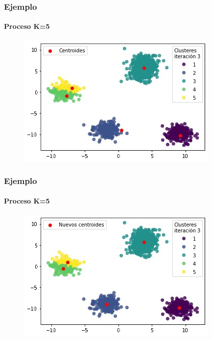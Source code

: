 \documentclass[
  shownotes,
  xcolor={svgnames},
  hyperref={colorlinks,citecolor=DarkBlue,linkcolor=DarkRed,urlcolor=DarkBlue}
  , aspectratio=169]{beamer}
\begin{document}
\begin{frame}
\frametitle{Ejemplo}
\framesubtitle{Proceso K=5}


\begin{figure}[H] \centering

    \centering
    \includegraphics[scale=.7]{figures/k5_3.jpg}
  \\
  \tiny
\end{figure}


\end{frame}
\begin{frame}
\frametitle{Ejemplo}
\framesubtitle{Proceso K=5}


\begin{figure}[H] \centering

    \centering
    \includegraphics[scale=.7]{figures/k5_4.jpg}
  \\
  \tiny
\end{figure}


\end{frame}
\end{document}
